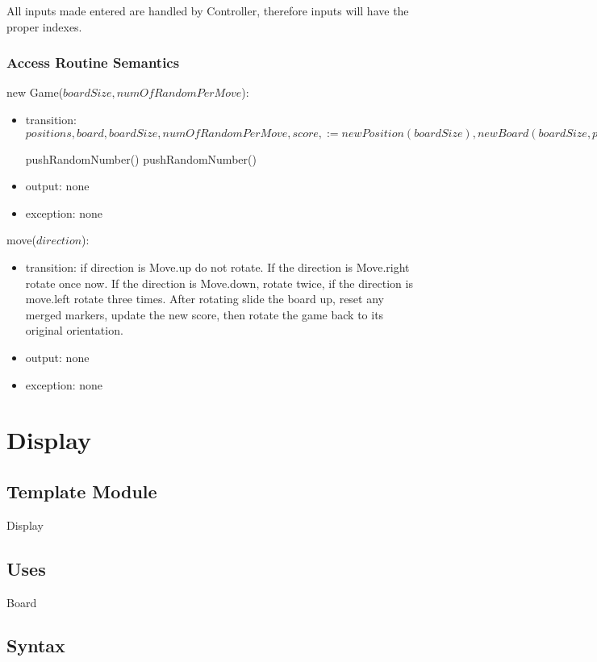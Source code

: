 \documentclass[12pt]{article}
\begin{document}
All inputs made entered are handled by Controller, therefore inputs will have the proper indexes.

\subsubsection* {Access Routine Semantics}

\noindent new Game($boardSize, numOfRandomPerMove$):
\begin{itemize}
\item transition:
$positions, board, boardSize, numOfRandomPerMove, score, := new Position(boardSize), new Board(boardSize, positions), boardSize, numOfRandomPerMove, score$

pushRandomNumber()
pushRandomNumber()
\item output: none
\item exception: none
\end{itemize}

\noindent move($direction$):
\begin{itemize}
\item transition:
if direction is Move.up do not rotate. If the direction is Move.right rotate once now. If the direction is Move.down, rotate twice, if the direction is move.left rotate three times. After rotating slide the board up, reset any merged markers, update the new score, then rotate the game back to its original orientation.
\item output: none
\item exception: none
\end{itemize}

\newpage

\section* {Display}

\subsection*{Template Module}

Display

\subsection* {Uses}

Board

\subsection* {Syntax}
\end{document}
